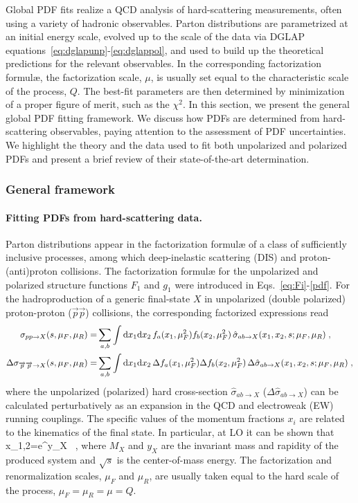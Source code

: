 Global PDF fits realize a QCD analysis of hard-scattering measurements,
often using a variety of hadronic observables.
%
Parton distributions are parametrized at an initial energy scale, 
evolved up to the scale of the data via DGLAP 
equations~\eqref{eq:dglapunp}-\eqref{eq:dglappol}, and used to build up the 
theoretical predictions for the relevant observables.
%
In the corresponding factorization formul\ae, the factorization scale, $\mu$,
is usually set equal to the characteristic scale of the process, $Q$.
%
The best-fit parameters are then determined by minimization of a proper figure
of merit, such as the $\chi^2$.
%
In this section, we present the general global PDF fitting framework.
%
We discuss how PDFs are determined from hard-scattering observables,
paying attention to the assessment of PDF uncertainties.
%
We highlight the theory and the data used to fit both unpolarized and 
polarized PDFs and present a brief review of their state-of-the-art 
determination.

\subsubsection{General framework}
\label{sec:genframework}

\paragraph*{Fitting PDFs from hard-scattering data.} 
Parton distributions appear in the factorization formul{\ae} of a class of 
sufficiently inclusive processes, among which deep-inelastic scattering (DIS) 
and proton-(anti)proton collisions.
%
The factorization formul{\ae} for the unpolarized and polarized structure 
functions $F_1$ and $g_1$ were introduced in Eqs.~\eqref{eq:Fi}-\eqref{pdf}.
%
For the hadroproduction of a generic final-state $X$ in unpolarized 
(double polarized) proton-proton ($\overrightarrow{p}\overrightarrow{p}$) 
collisions, the corresponding factorized expressions read
\begin{align}
\sigma_{pp\to X}(s,\mu_F,\mu_R)=&\sum_{a,b}\int {\rm d}x_1 {\rm d}x_2\, 
f_a(x_1,\mu_F^2)f_b(x_2,\mu_F^2)\,
\hat{\sigma}_{ab\to X}(x_1,x_2,s;\mu_{F},\mu_R)\;,
\label{eq:LHCxsecunp}
\\
\Delta\sigma_{\overrightarrow{p}\overrightarrow{p}\to X}(s,\mu_F,\mu_R)=&\sum_{a,b}\int {\rm d}x_1 {\rm d}x_2\, 
\Delta f_a(x_1,\mu_F^2)\Delta f_b(x_2,\mu_F^2)\,
\Delta\hat{\sigma}_{ab\to X}(x_1,x_2,s;\mu_{F},\mu_R)\;,
\label{eq:LHCxsecpol}
\end{align}
where the unpolarized (polarized) hard cross-section 
$\hat{\sigma}_{ab\to X}$ ($\Delta\hat{\sigma}_{ab\to X}$) can be calculated 
perturbatively as an expansion in the QCD and electroweak (EW) 
running couplings.
%
The specific values of the momentum fractions
$x_i$ are related to the kinematics of the final state.
%
In particular, at LO it can be shown that
\be
x_{1,2}=e^{\pm y_X} \, ,
\ee
where $M_X$ and $y_X$ are the invariant mass and rapidity of the produced 
system and $\sqrt{s}$ is the center-of-mass energy.
%
The factorization and renormalization scales, $\mu_F$ and $\mu_R$, are 
usually taken equal to the hard scale of the process, $\mu_F=\mu_R=\mu=Q$.

